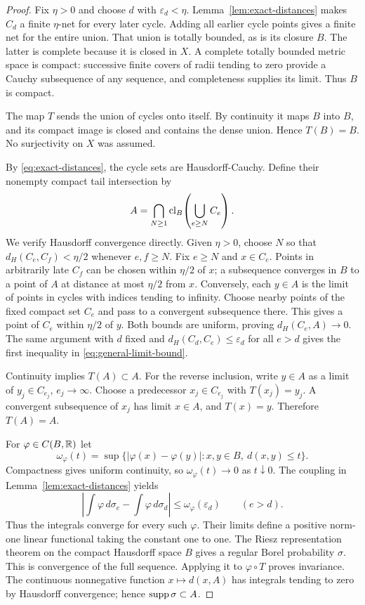 \begin{proof}
Fix $\eta>0$ and choose $d$ with $\varepsilon_d<\eta$.
Lemma~\ref{lem:exact-distances} makes $C_d$ a finite $\eta$-net
for every later cycle. Adding all earlier cycle points gives a finite
net for the entire union. That union is totally bounded, as is its
closure $B$. The latter is complete because it is closed in $X$.
A complete totally bounded metric space is compact: successive finite
covers of radii tending to zero provide a Cauchy subsequence of any
sequence, and completeness supplies its limit. Thus $B$ is compact.

The map $T$ sends the union of cycles onto itself. By continuity it
maps $B$ into $B$, and its compact image is closed and contains the
dense union. Hence $T(B)=B$. No surjectivity on $X$ was assumed.

By \eqref{eq:exact-distances}, the cycle sets are Hausdorff-Cauchy.
Define their nonempty compact tail intersection by
\begin{equation}\label{eq:tail-set}
 A=\bigcap_{N\ge1}\operatorname{cl}_B\!\left(\bigcup_{e\ge N}C_e\right).
\end{equation}
We verify Hausdorff convergence directly. Given $\eta>0$, choose
$N$ so that $d_H(C_e,C_f)<\eta/2$ whenever $e,f\ge N$. Fix
$e\ge N$ and $x\in C_e$. Points in arbitrarily late $C_f$ can be
chosen within $\eta/2$ of $x$; a subsequence converges in $B$ to
a point of $A$ at distance at most $\eta/2$ from $x$.
Conversely, each $y\in A$ is the limit of points in cycles with
indices tending to infinity. Choose nearby points of the fixed
compact set $C_e$ and pass to a convergent subsequence there. This
gives a point of $C_e$ within $\eta/2$ of $y$. Both bounds are
uniform, proving $d_H(C_e,A)\to0$. The same argument with $d$
fixed and $d_H(C_d,C_e)\le\varepsilon_d$ for all $e>d$ gives
the first inequality in \eqref{eq:general-limit-bound}.

Continuity implies $T(A)\subset A$. For the reverse inclusion,
write $y\in A$ as a limit of $y_j\in C_{e_j}$, $e_j\to\infty$.
Choose a predecessor $x_j\in C_{e_j}$ with $T(x_j)=y_j$.
A convergent subsequence of $x_j$ has limit $x\in A$, and
$T(x)=y$. Therefore $T(A)=A$.

For $\varphi\in C(B,\mathbb R)$ let
\[
 \omega_\varphi(t)=\sup\{|\varphi(x)-\varphi(y)|:
                      x,y\in B,\ d(x,y)\le t\}.
\]
Compactness gives uniform continuity, so $\omega_\varphi(t)\to0$
as $t\downarrow0$. The coupling in Lemma~\ref{lem:exact-distances}
yields
\begin{equation}\label{eq:modulus-bound}
 \left|\int\varphi\,d\sigma_e-\int\varphi\,d\sigma_d\right|
 \le\omega_\varphi(\varepsilon_d)\qquad(e>d).
\end{equation}
Thus the integrals converge for every such $\varphi$. Their limits
define a positive norm-one linear functional taking the constant
one to one. The Riesz representation theorem on the compact
Hausdorff space $B$ gives a regular Borel probability $\sigma$.
This is convergence of the full sequence. Applying it to
$\varphi\circ T$ proves invariance. The continuous nonnegative
function $x\mapsto d(x,A)$ has integrals tending to zero by
Hausdorff convergence; hence $\operatorname{supp}\sigma\subset A$.


\end{proof}
